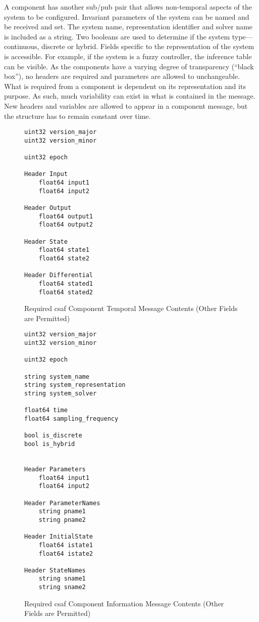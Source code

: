 A component has another sub/pub pair that allows non-temporal aspects of the system to be configured. 
Invariant parameters of the system can be named and be received and set. The system name, representation 
identifier and solver name is included as a string. Two booleans are used to determine if the 
system type---continuous, discrete or hybrid.  Fields specific to the representation of the system is 
accessible. For example, if the system is a fuzzy controller, the inference table can be visible. As the 
components have a varying degree of transparency (``black box''), no headers are required and parameters 
are allowed to unchangeable. \\

What is required from a component is dependent on its representation and its purpose. As such, much 
variability can exist in what is contained in the message. New headers and variables are allowed to appear in a 
component message, but the structure has to remain constant over time. \\

\begin{figure}
\begin{lstlisting}
uint32 version_major
uint32 version_minor

uint32 epoch

Header Input
	float64 input1
	float64 input2
	
Header Output
	float64 output1
	float64 output2
	
Header State
	float64 state1
	float64 state2
	
Header Differential
	float64 stated1
	float64 stated2
\end{lstlisting}
\caption{Required \acrshort{csaf}  Component Temporal Message Contents (Other Fields are Permitted)}
\label{fig:cmsg}
\end{figure}

\begin{figure}
\begin{lstlisting}
uint32 version_major
uint32 version_minor

uint32 epoch

string system_name
string system_representation
string system_solver

float64 time
float64 sampling_frequency

bool is_discrete
bool is_hybrid


Header Parameters
	float64 input1
	float64 input2
	
Header ParameterNames
	string pname1
	string pname2
	
Header InitialState
	float64 istate1
	float64 istate2
	
Header StateNames
	string sname1
	string sname2
\end{lstlisting}
\caption{Required \acrshort{csaf}  Component Information Message Contents (Other Fields are Permitted)}
\label{fig:cmsg}
\end{figure}

